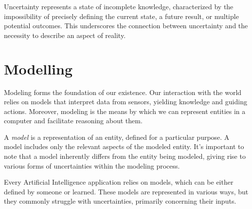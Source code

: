 \documentclass[12pt, a4paper]{report}
\begin{document}
    Uncertainty represents a state of incomplete knowledge, characterized by the impossibility of precisely defining the current state, a future result, or multiple potential outcomes. 
    This underscores the connection between uncertainty and the necessity to describe an aspect of reality.

    \section{Modelling}
    Modeling forms the foundation of our existence. Our interaction with the world relies on models that interpret data from sensors, yielding knowledge and guiding actions. 
    Moreover, modeling is the means by which we can represent entities in a computer and facilitate reasoning about them.
    \begin{definition}
        A \emph{model} is a representation of an entity, defined for a particular purpose. A model includes only the relevant aspects of the modeled entity. 
        It's important to note that a model inherently differs from the entity being modeled, giving rise to various forms of uncertainties within the modeling process.
    \end{definition}
    Every Artificial Intelligence application relies on models, which can be either defined by someone or learned. These models are represented in various ways, but they commonly struggle with uncertainties, primarily concerning their inputs.
\end{document}
